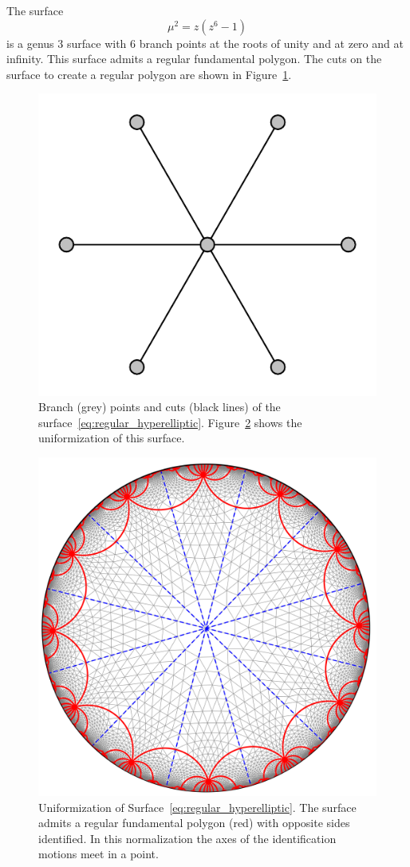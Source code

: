 \documentclass[Thesis.tex]{subfiles}
\begin{document}
\begin{example}
The surface 
\begin{equation}
	\label{eq:regular_hyperelliptic}
	\mu^2=z(z^6-1)
\end{equation} 
is a genus $3$ surface with $6$ branch points at the 
roots of unity and at zero and at infinity. This surface admits a regular fundamental polygon.
The cuts on the surface to create a regular polygon are shown in Figure~\ref{fig:regular_branchdata}.
\end{example}

\begin{figure}[h]
\centering
\includegraphics[width=0.2\linewidth]{data/g3_hyperelliptic01/curve.pdf}
\caption{Branch (grey) points and cuts (black lines) of the surface~\ref{eq:regular_hyperelliptic}.
Figure~\ref{fig:regular_cover} shows the uniformization of this surface.}
\label{fig:regular_branchdata}
\end{figure}

\begin{figure}
\centering
\includegraphics[width=\linewidth]{data/g3_hyperelliptic01/cover05.png}
\caption{Uniformization of Surface~\ref{eq:regular_hyperelliptic}. The surface admits
a regular fundamental polygon (red) with opposite sides identified. In this normalization
the axes of the identification motions meet in a point.}
\label{fig:regular_cover}
\end{figure}
\end{document}
